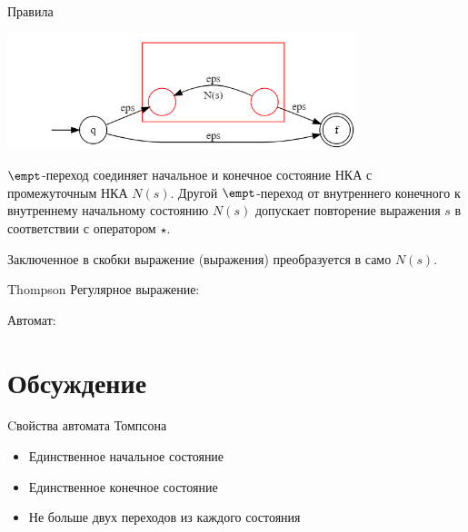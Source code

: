 \begin{frame}{Правила}
{        \includegraphics[width=4in, keepaspectratio]{tompson_rule5.png} %

        $\empt$-переход соединяет начальное и конечное состояние НКА с промежуточным НКА $N(s)$. Другой $\empt$-переход от внутреннего конечного к внутреннему начальному состоянию $N(s)$ допускает повторение выражения $s$ в соответствии с оператором $\star$.

        Заключенное в скобки выражение (выражения) преобразуется в само $N(s)$.
    }
\end{frame}%

\begin{frame}{Thompson}
	Регулярное выражение:

	Автомат:


\end{frame}

\section{Обсуждение}
\begin{frame}{Cвойства автомата Томпсона}
    \begin{itemize}
        \item Единственное начальное состояние
        \item Единственное конечное состояние
        \item Не больше двух переходов из каждого состояния
    \end{itemize}
\end{frame}
